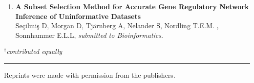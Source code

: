 \begin{enumerate}[P{A}PER I: ]
\item\textbf{A Subset Selection Method for Accurate Gene Regulatory Network Inference of Uninformative Datasets}\\
Seçilmiş D, Morgan D, Tj{\"a}rnberg A, Nelander S, Nordling T.E.M. , Sonnhammer E.L.L, \emph{submitted to Bioinformatics}.



\end{enumerate}
\noindent \emph{$^{\dagger}$contributed equally}

\noindent
\rule{\linewidth}{0.5mm}

\vspace{2mm}

\noindent
Reprints were made with permission from the publishers.\\
\noindent \\



